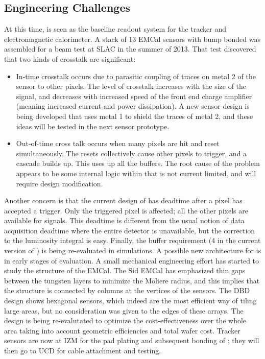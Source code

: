 \subsection{Engineering Challenges}
At this time, \KPIX is seen as the baseline readout system for the tracker and electromagnetic calorimeter. A stack of 13 EMCal sensors with bump bonded \KPIX was assembled for a beam test at SLAC in the summer of 2013. That test discovered that two kinds of crosstalk are significant:
\begin{itemize}
	\item In-time crosstalk occurs due to parasitic coupling of traces on metal 2 of the sensor to other pixels. The level of crosstalk increases with the size of the signal, and decreases with increased speed of the front end charge amplifier (meaning increased current and power dissipation).  A new sensor design is being developed that uses metal 1 to shield the traces of metal 2, and these ideas will be tested in the next sensor prototype.
	\item Out-of-time cross talk occurs when many pixels are hit and reset simultaneously. The resets collectively cause other pixels to trigger, and a cascade builds up. This uses up all the \KPIX buffers. The root cause of the problem appears to be some internal logic within \KPIX that is not current limited, and will require design modification.
\end{itemize}


Another concern is that the current design of \KPIX has deadtime after a pixel has accepted a trigger. Only the triggered pixel is affected; all the other pixels are available for signals. This deadtime is different from the usual notion of data acquisition deadtime where the entire detector is unavailable, but the correction to the luminosity integral is easy. Finally, the buffer requirement (4 in the current version of \KPIX) is being re-evaluated in \SID simulations. A possible new architecture for \KPIX is in early stages of evaluation.
A small mechanical engineering effort has started to study the structure of the EMCal. The Sid EMCal has emphasized thin gaps between the tungsten layers to minimize the Moliere radius, and this implies that the structure is connected by columns at the vertices of the sensors. The DBD design shows hexagonal sensors, which indeed are the most efficient way of tiling large areas, but no consideration was given to the edges of these arrays. The design is being re-evalutated to optimize the cost-effectiveness over the whole area taking into account geometric efficiencies and total wafer cost.
Tracker sensors are now at IZM for the pad plating and subsequent bonding of \KPIX; they will then go to UCD for cable attachment and testing.


